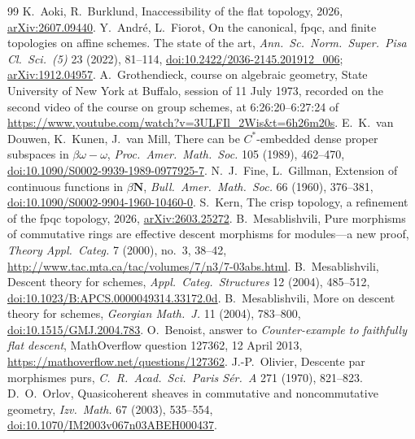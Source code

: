 \documentclass[11pt,a4paper]{amsart}
\theoremstyle{definition}
\theoremstyle{remark}
\begin{document}
\begin{thebibliography}{99}
 K.~Aoki, R.~Burklund, Inaccessibility of the flat topology, 2026, \href{https://arxiv.org/abs/2607.09440}{arXiv:2607.09440}.
 Y.~André, L.~Fiorot, On the canonical, fpqc, and finite topologies on affine schemes. The state of the art, \emph{Ann.\ Sc.\ Norm.\ Super.\ Pisa Cl.\ Sci.~(5)} 23 (2022), 81--114, \href{https://doi.org/10.2422/2036-2145.201912_006}{doi:10.2422/2036-2145.201912\_006}; \href{https://arxiv.org/abs/1912.04957}{arXiv:1912.04957}.
 A.~Grothendieck, course on algebraic geometry, State University of New York at Buffalo, session of 11 July 1973, recorded on the second video of the course on group schemes, at 6:26:20--6:27:24 of \url{https://www.youtube.com/watch?v=3ULFIl_2Wis&t=6h26m20s}.
 E.~K.~van Douwen, K.~Kunen, J.~van Mill, There can be $C^*$-embedded dense proper subspaces in $\beta\omega-\omega$, \emph{Proc.\ Amer.\ Math.\ Soc.} 105 (1989), 462--470, \href{https://doi.org/10.1090/S0002-9939-1989-0977925-7}{doi:10.1090/S0002-9939-1989-0977925-7}.
 N.~J.~Fine, L.~Gillman, Extension of continuous functions in $\beta\mathbf N$, \emph{Bull.\ Amer.\ Math.\ Soc.} 66 (1960), 376--381, \href{https://doi.org/10.1090/S0002-9904-1960-10460-0}{doi:10.1090/S0002-9904-1960-10460-0}.
 S.~Kern, The crisp topology, a refinement of the fpqc topology, 2026, \href{https://arxiv.org/abs/2603.25272}{arXiv:2603.25272}.
 B.~Mesablishvili, Pure morphisms of commutative rings are effective descent morphisms for modules---a new proof, \emph{Theory Appl.\ Categ.} 7 (2000), no.~3, 38--42, \url{http://www.tac.mta.ca/tac/volumes/7/n3/7-03abs.html}.
 B.~Mesablishvili, Descent theory for schemes, \emph{Appl.\ Categ.\ Structures} 12 (2004), 485--512, \href{https://doi.org/10.1023/B:APCS.0000049314.33172.0d}{doi:10.1023/B:APCS.0000049314.33172.0d}.
 B.~Mesablishvili, More on descent theory for schemes, \emph{Georgian Math.\ J.} 11 (2004), 783--800, \href{https://doi.org/10.1515/GMJ.2004.783}{doi:10.1515/GMJ.2004.783}.
 O.~Benoist, answer to \emph{Counter-example to faithfully flat descent}, MathOverflow question 127362, 12 April 2013, \url{https://mathoverflow.net/questions/127362}.
 J.-P.~Olivier, Descente par morphismes purs, \emph{C.\ R.\ Acad.\ Sci.\ Paris Sér.~A} 271 (1970), 821--823.
 D.~O.~Orlov, Quasicoherent sheaves in commutative and noncommutative geometry, \emph{Izv.\ Math.} 67 (2003), 535--554, \href{https://doi.org/10.1070/IM2003v067n03ABEH000437}{doi:10.1070/IM2003v067n03ABEH000437}.

\end{thebibliography}
\end{document}
